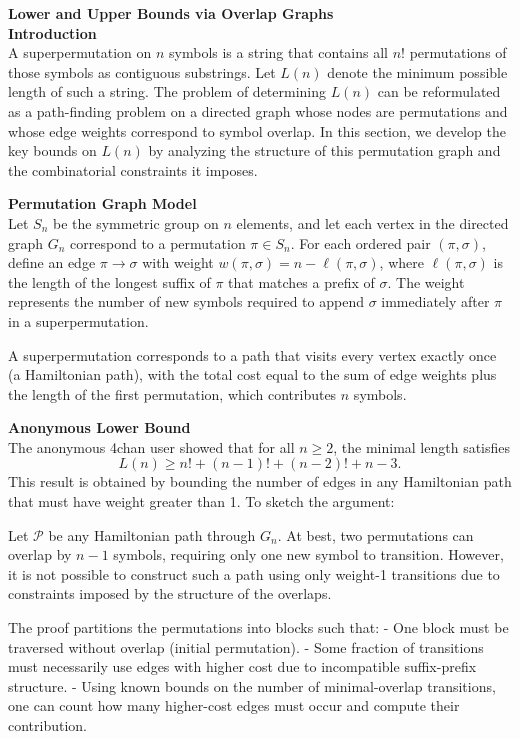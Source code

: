 \begin{technical}
{\Large\textbf{Lower and Upper Bounds via Overlap Graphs}}\\[0.7em]

\noindent\textbf{Introduction}\\[0.5em]
A superpermutation on \(n\) symbols is a string that contains all \(n!\) permutations of those symbols as contiguous substrings. Let \(L(n)\) denote the minimum possible length of such a string. The problem of determining \(L(n)\) can be reformulated as a path-finding problem on a directed graph whose nodes are permutations and whose edge weights correspond to symbol overlap. In this section, we develop the key bounds on \(L(n)\) by analyzing the structure of this permutation graph and the combinatorial constraints it imposes.

\noindent\textbf{Permutation Graph Model}\\[0.5em]
Let \(S_n\) be the symmetric group on \(n\) elements, and let each vertex in the directed graph \(G_n\) correspond to a permutation \(\pi \in S_n\). For each ordered pair \((\pi, \sigma)\), define an edge \(\pi \rightarrow \sigma\) with weight \(w(\pi, \sigma) = n - \ell(\pi, \sigma)\), where \(\ell(\pi, \sigma)\) is the length of the longest suffix of \(\pi\) that matches a prefix of \(\sigma\). The weight represents the number of new symbols required to append \(\sigma\) immediately after \(\pi\) in a superpermutation.

A superpermutation corresponds to a path that visits every vertex exactly once (a Hamiltonian path), with the total cost equal to the sum of edge weights plus the length of the first permutation, which contributes \(n\) symbols.

\noindent\textbf{Anonymous Lower Bound}\\[0.5em]
The anonymous 4chan user showed that for all \(n \geq 2\), the minimal length satisfies
\[
L(n) \geq n! + (n-1)! + (n-2)! + n - 3.
\]
This result is obtained by bounding the number of edges in any Hamiltonian path that must have weight greater than 1. To sketch the argument:

Let \(\mathcal{P}\) be any Hamiltonian path through \(G_n\). At best, two permutations can overlap by \(n-1\) symbols, requiring only one new symbol to transition. However, it is not possible to construct such a path using only weight-1 transitions due to constraints imposed by the structure of the overlaps.

The proof partitions the permutations into blocks such that:
- One block must be traversed without overlap (initial permutation).
- Some fraction of transitions must necessarily use edges with higher cost due to incompatible suffix-prefix structure.
- Using known bounds on the number of minimal-overlap transitions, one can count how many higher-cost edges must occur and compute their contribution.


\end{technical}
